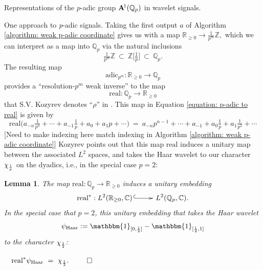 \documentclass[letterpaper,11pt, reqno]{amsart}
\makeatletter
\newtheorem{monodromy theorem}{Monodromy Theorem}[subsection]
\newtheorem{wild conjecture}[theorem]{Wild Conjecture}
\newtheorem{lemma}[theorem]{Lemma}
\newtheorem{research objectives}{Research objectives}[subsection]
\newtheorem{research question}[theorem]{Research questions}
\newtheorem{aside question}[theorem]{Aside question}
\newtheorem{audio example}[theorem]{\loudspeaker[3] Example}
\newtheorem{blank remark}[theorem]{}
\newtheorem{terminology and comment}[theorem]{Terminology and comment}
\newtheorem{purity hypothesis}[theorem]{Purity hypothesis}
\newtheorem{corollary of the purity hypothesis}[theorem]{Corollary of the purity hypothesis}
\newcommand{\CC} {{\mathbb C}}
\newcommand{\QQ} {{\mathbb Q}}
\newcommand{\RR} {{\mathbb R}}
\newcommand{\ZZ} {{\mathbb Z}}
\newcommand{\mono}{\!\xymatrix{{}\ar@{^{(}->}[r]&{}}\!}
\numberwithin{equation}{theorem}
\makeatother
\begin{document}
\begin{section}{Representations of the $p$-adic group $\bold{A}^{\!1}(\mathbb{Q}_{p})$ in wavelet signals.}
\begin{subsection}{One approach to {\em p}-adic signals.}
Taking the first output $a$ of Algorithm \ref{algorithm: weak p-adic coordinate} gives us with a map
	$
	\RR_{\ge0}\longrightarrow\tfrac{1}{p^m}\ZZ,
	$
which we can interpret as a map into $\QQ_{p}$ via the natural inclusions
	$$
	\tfrac{1}{p^m}\ZZ
	\ \subset\ 
	\ZZ\big[\tfrac{1}{p}\big]
	\ \subset\ 
	\QQ_{p}.
	$$
The resulting map
	\begin{equation}\label{equation: weak inverse from algorithm}
	\text{adic}_{p^m}:\RR_{\ge0}\longrightarrow\QQ_p
	\end{equation}
provides a ``resolution-$p^{m}$ weak inverse'' to the map
	\begin{equation}\label{equation: p-adic to real}
	\text{real}:\QQ_{p}\longrightarrow\RR_{\ge0}
	\end{equation}
that S.V. Kozyrev denotes ``$\rho$'' in \cite[p. 7, Equation (12)]{Kozyrev}. This map in Equation \eqref{equation: p-adic to real} is given by
	$$
	\text{real}\big(a_{-n}\tfrac{1}{p^{n}}+\cdots+a_{-1}\tfrac{1}{p}+a_0+a_1 p+\cdots\big)
	\ =\ 
	a_{-n}p^{n-1}+\cdots+a_{-1}+a_0\tfrac{1}{p}+a_1\tfrac{1}{p^{2}}+\cdots
	$$
{\color{red} [Need to make indexing here match indexing in Algorithm \ref{algorithm: weak p-adic coordinate}]}
Kozyrev points out that this map $\text{real}$ induces a unitary map between the associated $L^2$ spaces, and takes the Haar wavelet to our character $\chi_{\text{{\smaller\smaller\smaller $\tfrac{1}{p}$}}}$ on the dyadics, i.e., in the special case $p=2$:

\begin{lemma}\label{lemma: Kozyrev}
\normalfont
\cite[Lemmas 5 \& 6]{Kozyrev}
The map $\text{real}:\QQ_{p}\longrightarrow\RR_{\ge0}$ induces a unitary embedding
	$$
	\text{real}^\ast:L^2(\RR_{\ge0},\CC)\mono L^2(\QQ_{p},\CC).
	$$
In the special case that $p=2$, this unitary embedding
that takes the Haar wavelet $$\psi_{\text{Haar}}:=\mathbbm{1}_{[0,\text{{\smaller\smaller\smaller $\tfrac{1}{2}$}}]}-\mathbbm{1}_{[\text{{\smaller\smaller\smaller $\tfrac{1}{2}$}},1]}$$ to the character $\chi_{\text{{\smaller\smaller\smaller $\tfrac{1}{2}$}}}$:

\hfill \ \ $
	\text{real}^\ast\psi_{\text{Haar}}
	\ =\ 
	\chi_{\text{{\smaller\smaller\smaller $\tfrac{1}{2}$}}}.
 	$
\hfill $\qed$
\end{lemma}


\end{subsection}
\end{section}
\end{document}
